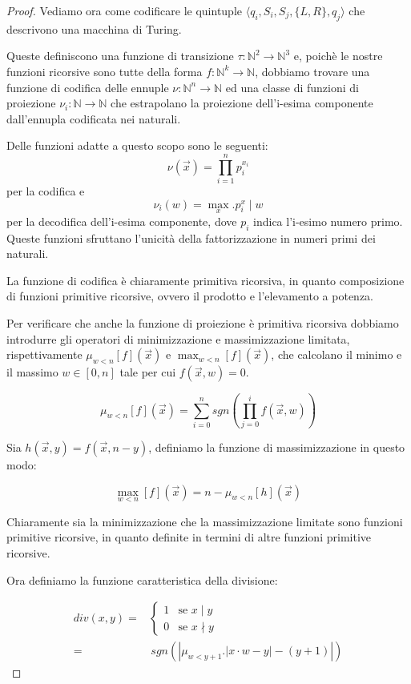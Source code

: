 \begin{proof}
Vediamo ora come codificare le quintuple $\langle q_i, S_i, S_j,
\{L,R\}, q_j \rangle$ che descrivono una macchina di Turing.

Queste definiscono una funzione di transizione $\tau : \mathbb{N}^2
\rightarrow \mathbb{N}^3$ e, poichè le nostre funzioni ricorsive sono
tutte della forma $f:\mathbb{N}^k \rightarrow \mathbb{N}$, dobbiamo
trovare una funzione di codifica delle ennuple $\nu: \mathbb{N}^n
\rightarrow \mathbb{N}$ ed una classe di funzioni di proiezione
$\nu_i: \mathbb{N} \rightarrow \mathbb{N}$ che estrapolano la
proiezione dell'i-esima componente dall'ennupla codificata nei
naturali.

Delle funzioni adatte a questo scopo sono le seguenti:
$$\nu(\vec{x}) = \prod_{i=1}^n p_i^{x_i}$$ per la codifica
e $$\nu_i(w) = \max_x.p_i^x \mid w$$ per la decodifica dell'i-esima
componente, dove $p_i$ indica l'i-esimo numero primo. Queste funzioni
sfruttano l'unicità della fattorizzazione in numeri primi dei
naturali.

La funzione di codifica è chiaramente primitiva ricorsiva, in quanto
composizione di funzioni primitive ricorsive, ovvero il prodotto e
l'elevamento a potenza.

Per verificare che anche la funzione di proiezione è primitiva
ricorsiva dobbiamo introdurre gli operatori di minimizzazione e
massimizzazione limitata, rispettivamente $\mu_{w<n}[f](\vec{x})$ e
$\max_{w<n}[f](\vec{x})$, che calcolano il minimo e il massimo $w \in
[0,n]$ tale per cui $f(\vec{x}, w) = 0$.

$$\mu_{w<n}[f](\vec{x}) = \sum_{i=0}^n sgn\left(\prod_{j=0}^i
f(\vec{x},w)\right)$$

Sia $h(\vec{x},y) = f(\vec{x},n-y)$, definiamo la funzione di
massimizzazione in questo modo:

$$\max_{w<n}[f](\vec{x}) = n-\mu_{w<n}[h](\vec{x})$$

Chiaramente sia la minimizzazione che la massimizzazione limitate sono
funzioni primitive ricorsive, in quanto definite in termini di altre
funzioni primitive ricorsive.

Ora definiamo la funzione caratteristica della divisione:

\begin{align*}
div(x,y) =& \left\{
\begin{array}{ll}
1 & \text{se } x \mid y\\
0 & \text{se } x \nmid y
\end{array}
\right. \\
=& \, sgn\left( \left| \mu_{w<y+1}.\left|x \cdot w - y \right| - (y+1)\right|
\right)
\end{align*}


\end{proof}
